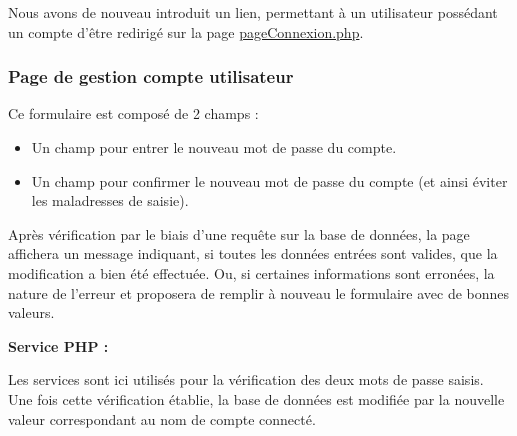 
        \newpage
        
            \begin{paragraphe}
                Nous avons de nouveau introduit un lien, permettant à un utilisateur possédant un compte d'être redirigé sur la page \underline{pageConnexion.php}.
            \end{paragraphe}


    \clearpage

		\subsubsection{Page de gestion compte utilisateur}

			\begin{paragraphe}
				Ce formulaire est composé de 2 champs :
				\begin{itemize}
					\item Un champ pour entrer le nouveau mot de passe du compte.
					\item Un champ pour confirmer le nouveau mot de passe du compte (et ainsi éviter les maladresses de saisie).
				\end{itemize}
			\end{paragraphe}

			\begin{paragraphe}
				Après vérification par le biais d'une requête sur la base de données, la page affichera un message indiquant, si toutes les données entrées sont valides, que la modification a bien été effectuée. Ou, si certaines informations sont erronées, la nature de l'erreur et proposera de remplir à nouveau le formulaire avec de bonnes valeurs.
			\end{paragraphe}

			\begin{paragraphe}
				\textbf{Service PHP :}
			\end{paragraphe}

			\begin{paragraphe}
				Les services sont ici utilisés pour la vérification des deux mots de passe saisis. \\
				Une fois cette vérification établie, la base de données est modifiée par la nouvelle valeur correspondant au nom de compte connecté.
			\end{paragraphe}

